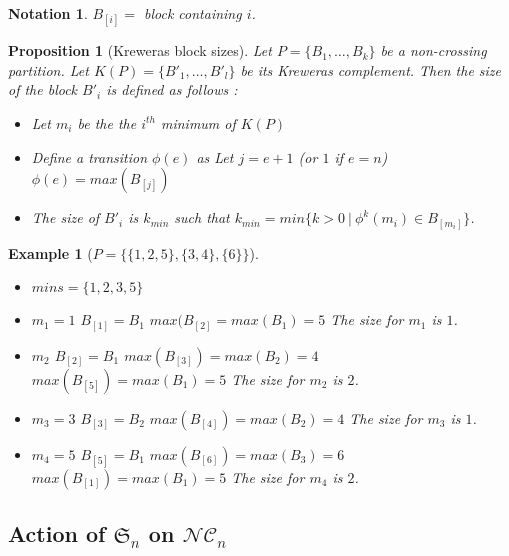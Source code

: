 \documentclass[12pt]{report}
\newtheorem*{prop}{Proposition}
\newtheorem*{example}{Example}
\newtheorem*{notation}{Notation}
\begin{document}
\begin{notation}
    $B_{[i]} = $ block containing $i$.
\end{notation}

\begin{prop}[Kreweras block sizes]
    Let $P = \{B_1, \ldots, B_k\}$ be a non-crossing partition.
    Let $K (P) = \{B'_1, \ldots, B'_l\}$ be its Kreweras complement.
    Then the size of the block $B'_i$ is defined as follows :
    \begin{itemize}
        \item Let $m_i$ be the the $i^{th}$ minimum of $K (P)$
        \item Define a \emph{transition} $\phi (e)$ as 
            \subitem Let $j = e + 1$ (or $1$ if $e = n$)
            \subitem $\phi(e) = max (B_{[j]})$
        \item The size of $B'_i$ is $k_{min}$ such that
        $k_{min} = min \{k > 0\ |\ \phi^k (m_i) \in B_{[m_i]}\}$.\\
    \end{itemize}
\end{prop}

\begin{example}[$P = \{\{1, 2, 5\}, \{3, 4\}, \{6\}\}$]
    ~\\
    \begin{itemize}
        \item $mins = \{1, 2, 3, 5\}$
        \item $m_1 = 1$
            \subitem $B_{[1]} = B_1$
            \subitem $max (B_{[2]} = max (B_1) = 5$
            \subitem The size for $m_1$ is $1$.
        \item $m_2$
            \subitem $B_{[2]} = B_1$
            \subitem $max (B_{[3]}) = max (B_2) = 4$
            \subitem $max (B_{[5]}) = max (B_1) = 5$
            \subitem The size for $m_2$ is $2$.
        \item $m_3 = 3$
            \subitem $B_{[3]} = B_2$
            \subitem $max (B_{[4]}) = max (B_2) = 4$
            \subitem The size for $m_3$ is $1$.
        \item $m_4 = 5$
            \subitem $B_{[5]} = B_1$
            \subitem $max (B_{[6]}) = max (B_3) = 6$
            \subitem $max (B_{[1]}) = max (B_1) = 5$
            \subitem The size for $m_4$ is $2$.
    \end{itemize}
\end{example}

\subsection{Action of $\mathfrak{S}_n$ on $\mathcal{NC}_n$}
\end{document}
